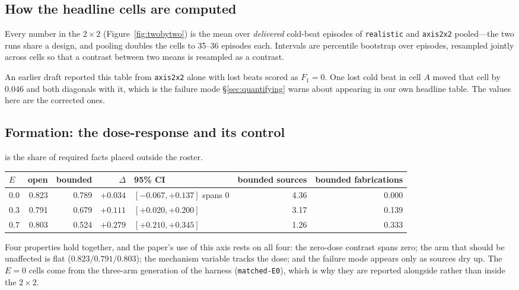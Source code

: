 
\ifcompact\fi

\subsection{How the headline cells are computed}
\label{app:aggregation}

Every number in the $2\times2$ (Figure~\ref{fig:twobytwo}) is the mean over \emph{delivered}
cold-beat episodes of \texttt{realistic} and \texttt{axis2x2} pooled---the two runs share a
design, and pooling doubles the cells to 35--36 episodes each. Intervals are percentile
bootstrap over episodes, resampled jointly across cells so that a contrast between two
means is resampled as a contrast.

An earlier draft reported this table from \texttt{axis2x2} alone with lost beats scored as
$F_1 = 0$. One lost cold beat in cell $A$ moved that cell by $0.046$ and both diagonals with
it, which is the failure mode \S\ref{sec:quantifying} warns about appearing in our own
headline table. The values here are the corrected ones.

\subsection{Formation: the dose-response and its control}
\label{app:dose}

 is the share of required facts placed outside the roster.

\begin{center}\small
\begin{tabular}{@{}lrrrlrr@{}}
\toprule
\textbf{$E$} & \textbf{open} & \textbf{bounded} & \textbf{$\Delta$} & \textbf{95\% CI} & \textbf{bounded sources} & \textbf{bounded fabrications} \\
\midrule
$0.0$ & 0.823 & 0.789 & $+0.034$ & $[-0.067, +0.137]$ spans 0 & 4.36 & 0.000 \\
$0.3$ & 0.791 & 0.679 & $+0.111$ & $[+0.020, +0.200]$ & 3.17 & 0.139 \\
$0.7$ & 0.803 & 0.524 & $+0.279$ & $[+0.210, +0.345]$ & 1.26 & 0.333 \\
\bottomrule
\end{tabular}
\end{center}

Four properties hold together, and the paper's use of this axis rests on all four: the
zero-dose contrast spans zero; the arm that should be unaffected is flat
($0.823/0.791/0.803$); the mechanism variable tracks the dose; and the failure mode
appears only as sources dry up. The $E=0$ cells come from the three-arm generation of
the harness (\texttt{matched-E0}), which is why they are reported alongside rather than
inside the $2\times2$.

